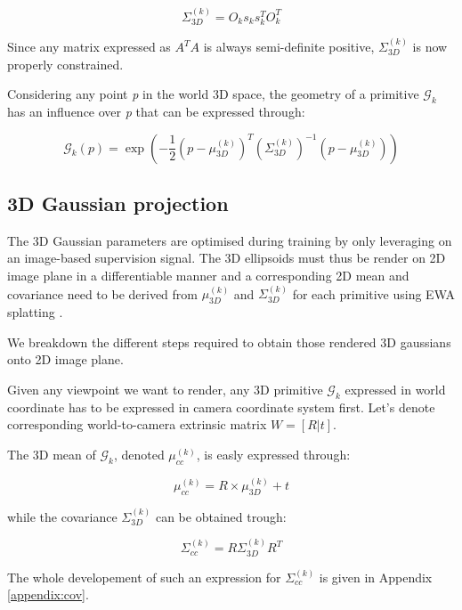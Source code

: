\begin{equation}
    \Sigma^{(k)}_{3D} = O_{k}s_{k}s_{k}^{T}O_{k}^{T}
\end{equation}

Since any matrix expressed as $A^{T}A$ is always semi-definite positive, $\Sigma^{(k)}_{3D}$ is now properly constrained. 

Considering any point \textit{p} in the world 3D space, the geometry of a primitive $\mathcal{G}_{k}$ has an influence over \textit{p} that can be expressed through: 

\begin{equation}
  \mathcal{G}_{k}(p) = \exp \left(-\frac{1}{2}(p-\mu^{(k)}_{3D})^{T}(\Sigma^{(k)}_{3D})^{-1}(p-\mu^{(k)}_{3D})\right)
\end{equation}

\subsection{3D Gaussian projection} The 3D Gaussian parameters are optimised during training by only leveraging on an image-based supervision signal. The 3D ellipsoids must thus be render on 2D image plane in a differentiable manner and a corresponding 2D mean and covariance need to be derived from $\mu^{(k)}_{3D}$ and $\Sigma^{(k)}_{3D}$ for each primitive using EWA splatting \citep{zwicker2001ewa}. 

We breakdown the different steps required to obtain those rendered 3D gaussians onto 2D image plane. 

Given any viewpoint we want to render, any 3D primitive $\mathcal{G}_{k}$ expressed in world coordinate has to be expressed in camera coordinate system first. Let's denote corresponding world-to-camera extrinsic matrix $W=[R|t]$. 

The 3D mean of $\mathcal{G}_{k}$, denoted $\mu^{(k)}_{cc}$, is easly expressed through: 

\begin{equation}
  \mu^{(k)}_{cc} = R\times \mu^{(k)}_{3D}+t
\end{equation}

while the covariance $\Sigma^{(k)}_{3D}$ can be obtained trough: 

\begin{equation}
  \Sigma^{(k)}_{cc}= R\Sigma^{(k)}_{3D}R^{T}
  \label{eq:gs-3dcov-transfrom}
\end{equation}

The whole developement of such an expression for $\Sigma^{(k)}_{cc}$ is given in Appendix \ref{appendix:cov}. 

